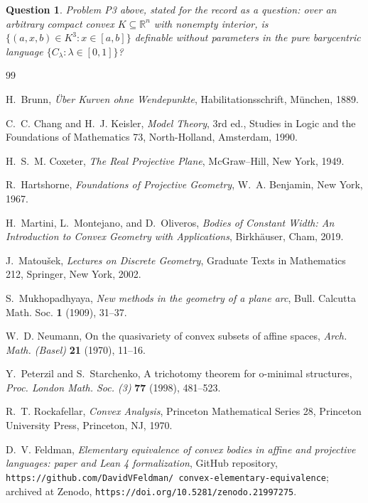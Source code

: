 \documentclass[11pt]{amsart}
\newtheorem{question}[theorem]{Question}
\theoremstyle{definition}
\newcommand{\R}{\mathbb{R}}
\begin{document}
\begin{question}\label{q:B-definable}
Problem P3 above, stated for the record as a question: over an arbitrary
compact convex $K\subseteq\R^n$ with nonempty interior, is
$\{(a,x,b)\in K^3:x\in[a,b]\}$ definable without parameters in the pure
barycentric language $\{C_\lambda:\lambda\in[0,1]\}$?
\end{question}

\begin{thebibliography}{99}

H.~Brunn,
\emph{\"Uber Kurven ohne Wendepunkte},
Habilitationsschrift, M\"unchen, 1889.

C.~C. Chang and H.~J. Keisler,
\emph{Model Theory}, 3rd ed.,
Studies in Logic and the Foundations of Mathematics 73,
North-Holland, Amsterdam, 1990.

H.~S.~M. Coxeter,
\emph{The Real Projective Plane},
McGraw--Hill, New York, 1949.

R.~Hartshorne,
\emph{Foundations of Projective Geometry},
W.~A. Benjamin, New York, 1967.

H.~Martini, L.~Montejano, and D.~Oliveros,
\emph{Bodies of Constant Width: An Introduction to Convex Geometry with
Applications},
Birkh\"auser, Cham, 2019.

J.~Matou\v sek,
\emph{Lectures on Discrete Geometry},
Graduate Texts in Mathematics 212, Springer, New York, 2002.

S.~Mukhopadhyaya,
\emph{New methods in the geometry of a plane arc},
Bull. Calcutta Math. Soc. \textbf{1} (1909), 31--37.

W.~D. Neumann,
On the quasivariety of convex subsets of affine spaces,
\emph{Arch. Math. (Basel)} \textbf{21} (1970), 11--16.

Y.~Peterzil and S.~Starchenko,
A trichotomy theorem for o-minimal structures,
\emph{Proc. London Math. Soc. (3)} \textbf{77} (1998), 481--523.

R.~T. Rockafellar,
\emph{Convex Analysis},
Princeton Mathematical Series 28,
Princeton University Press, Princeton, NJ, 1970.

D.~V. Feldman,
\emph{Elementary equivalence of convex bodies in affine and projective
languages: paper and Lean 4 formalization},
GitHub repository, \texttt{https://github.com/DavidVFeldman/\allowbreak
convex-elementary-equivalence}; archived at Zenodo,
\texttt{https://doi.org/10.5281/zenodo.21997275}.


\end{thebibliography}
\end{document}
